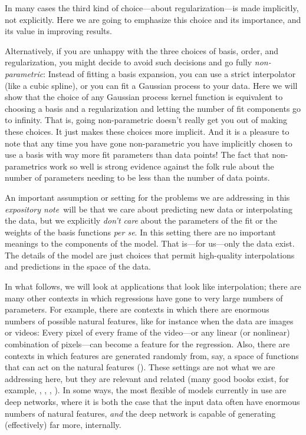 \documentclass[12pt,letterpaper]{article}
\newcommand{\documentname}{\textsl{expository note}}
\newcommand{\foreign}[1]{\textsl{#1}}
\begin{document}
In many cases the third kind of choice---about regularization---is made implicitly, not explicitly.
Here we are going to emphasize this choice and its importance, and its value in improving results.

Alternatively, if you are unhappy with the three choices of basis, order, and regularization, you might decide to avoid such decisions and go fully \emph{non-parametric}:
Instead of fitting a basis expansion, you can use a strict interpolator (like a cubic spline), or you can fit a Gaussian process to your data.
Here we will show that the choice of any Gaussian process kernel function is equivalent to choosing a basis and a regularization and letting the number of fit components go to infinity.
That is, going non-parametric doesn't really get you out of making these choices.
It just makes these choices more implicit.
And it is a pleasure to note that any time you have gone non-parametric you have implicitly chosen to use a basis with way more fit parameters than data points!
The fact that non-parametrics work so well is strong evidence against the folk rule about the number of parameters needing to be less than the number of data points.

An important assumption or setting for the problems we are addressing in this \documentname\ will be that we care about predicting new data or interpolating the data, but we explicitly \emph{don't care} about the parameters of the fit or the weights of the basis functions \foreign{per se}.
In this setting there are no important meanings to the components of the model.
That is---for us---only the data exist.
The details of the model are just choices that permit high-quality interpolations and predictions in the space of the data.

In what follows, we will look at applications that look like interpolation; there are many other contexts in which regressions have gone to very large numbers of parameters.
For example, there are contexts in which there are enormous numbers of possible natural features, like for instance when the data are images or videos: Every pixel of every frame of the video---or any linear (or nonlinear) combination of pixels---can become a feature for the regression.
Also, there are contexts in which features are generated randomly from, say, a space of functions that can act on the natural features (\citealt{rahimi2007random}).
These settings are not what we are addressing here, but they are relevant and related
(many good books exist, for example, \citealt{bishop}, \citealt{esl}, \citealt{agresti}, \citealt{gelman}).
In some ways, the most flexible of models currently in use are deep networks, where it is both the case that the input data often have enormous numbers of natural features, \emph{and} the deep network is capable of generating (effectively) far more, internally.
\end{document}
